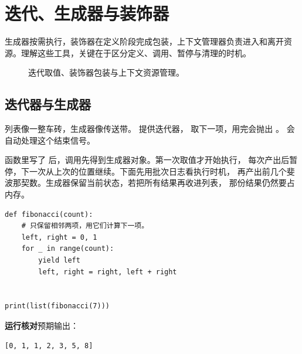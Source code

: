 \chapter{迭代、生成器与装饰器}
\label{ch:06-outline}

生成器按需执行，装饰器在定义阶段完成包装，上下文管理器负责进入和离开资源。理解这些工具，关键在于区分定义、调用、暂停与清理的时机。


\begin{figure}[htbp]
  \centering
  \caption*{迭代取值、装饰器包装与上下文资源管理。}
\end{figure}


\section{迭代器与生成器}

列表像一整车砖，生成器像传送带。
 提供迭代器， 取下一项，用完会抛出
。 会自动处理这个结束信号。

函数里写了  后，调用先得到生成器对象。第一次取值才开始执行，
每次产出后暂停，下一次从上次的位置继续。下面先用批次日志看执行时机，
再产出前几个斐波那契数。生成器保留当前状态，若把所有结果再收进列表，
那份结果仍然要占内存。


\begin{lstlisting}[title={\code{fibonacci.py}}]
def fibonacci(count):
    # 只保留相邻两项，用它们计算下一项。
    left, right = 0, 1
    for _ in range(count):
        yield left
        left, right = right, left + right


print(list(fibonacci(7)))
\end{lstlisting}


\textbf{运行核对}\enspace 预期输出：
\begin{lstlisting}[language={},numbers=none]
[0, 1, 1, 2, 3, 5, 8]
\end{lstlisting}

